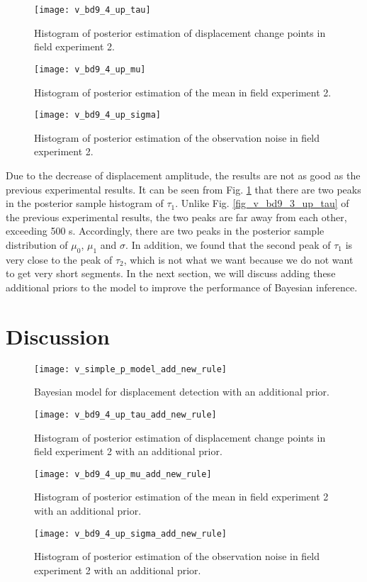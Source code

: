 \documentclass{svjour3}                     %
\begin{document}
\begin{figure}[htbp]
	\centering
	\texttt{[image: v\_bd9\_4\_up\_tau]}
	\caption{Histogram of posterior estimation of displacement change points in field experiment 2.}
	\label{fig_v_bd9_4_up_tau}
\end{figure} 
\begin{figure}[htbp]
	\centering
	\texttt{[image: v\_bd9\_4\_up\_mu]}
	\caption{Histogram of posterior estimation of the mean in field experiment 2.}
	\label{fig_v_bd9_4_up_mu}
\end{figure} 
\begin{figure}[htbp]
	\centering
	\texttt{[image: v\_bd9\_4\_up\_sigma]}
	\caption{Histogram of posterior estimation of the observation noise in field experiment 2.}
	\label{fig_v_bd9_4_up_sigma}
\end{figure}
Due to the decrease of displacement amplitude, the results are not as good as the previous experimental results. 
It can be seen from Fig. \ref{fig_v_bd9_4_up_tau} that there are two peaks in the posterior sample histogram of $\tau_1$. Unlike Fig. \ref{fig_v_bd9_3_up_tau} of the previous experimental results, the two peaks are far away from each other, exceeding 500 s. Accordingly, there are two peaks in the posterior sample distribution of $\mu_0$, $\mu_1$ and $\sigma$. In addition, we found that the second peak of $\tau_1$ is very close to the peak of $\tau_2$, which is not what we want because we do not want to get very short segments. In the next section, we will discuss adding these additional priors to the model to improve the performance of Bayesian inference.
\section{Discussion}
\label{disc}

\begin{figure}[H]
	\centering
	\texttt{[image: v\_simple\_p\_model\_add\_new\_rule]}
	\caption{Bayesian model for displacement detection with an additional prior.}
	\label{fig_v_simple_p_model_add_new_rule}
\end{figure} 
\begin{figure}[htbp]
	\centering
	\texttt{[image: v\_bd9\_4\_up\_tau\_add\_new\_rule]}
	\caption{Histogram of posterior estimation of displacement change points in field experiment 2 with an additional prior.}
	\label{fig_v_bd9_4_up_tau_add_new_rule}
\end{figure} 
\begin{figure}[htbp]
	\centering
	\texttt{[image: v\_bd9\_4\_up\_mu\_add\_new\_rule]}
	\caption{Histogram of posterior estimation of the mean in field experiment 2 with an additional prior.}
	\label{fig_v_bd9_4_up_mu_add_new_rule}
\end{figure} 
\begin{figure}[htbp]
	\centering
	\texttt{[image: v\_bd9\_4\_up\_sigma\_add\_new\_rule]}
	\caption{Histogram of posterior estimation of the observation noise in field experiment 2 with an additional prior.}
	\label{fig_v_bd9_4_up_sigma_add_new_rule}
\end{figure}
\end{document}
